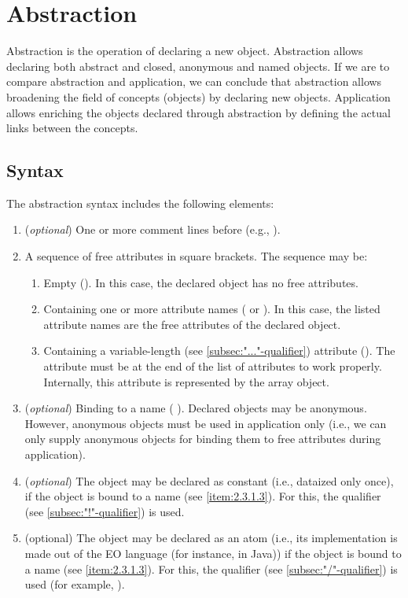 \documentclass[12pt]{book}
\begin{document}
\section{Abstraction} \label{sec:abstracion}
Abstraction is the operation of declaring a new object. Abstraction allows declaring both abstract and closed, anonymous and named objects.
If we are to compare abstraction and application, we can conclude that abstraction allows broadening the field of concepts (objects) by declaring new objects. Application allows enriching the objects declared through abstraction by defining the actual links between the concepts.

\subsection{Syntax}
The abstraction syntax includes the following elements:

\begin{enumerate}
    \item (\textit{optional}) One or more comment lines before (e.g., ).
    \item A sequence of free attributes in square brackets. The sequence may be:
    \begin{enumerate}
        \item Empty (\ff{[]}). In this case, the declared object has no free attributes.
        \item Containing one or more attribute names (\ff{[a]} or \ff{[a b c d e]}). In this case, the listed attribute names are the free attributes of the declared object.
        \item Containing a variable-length (see \ref{subsec:"..."-qualifier}) attribute (\ff{[animals...]}). The attribute must be at the end of the list of attributes to work properly. Internally, this attribute is represented by the array object.
    \end{enumerate}
    \item \label{item:2.3.1.3} (\textit{optional}) Binding to a name ( ). Declared objects may be anonymous. However, anonymous objects must be used in application only (i.e., we can only supply anonymous objects for binding them to free attributes during application).
    \item (\textit{optional}) The object may be declared as constant (i.e., dataized only once), if the object is bound to a name (see \ref{item:2.3.1.3}). For this, the \ff{!} qualifier (see \ref{subsec:"!"-qualifier}) is used.
    \item (optional) The object may be declared as an atom (i.e., its implementation is made out of the EO language (for instance, in Java)) if the object is bound to a name (see \ref{item:2.3.1.3}). For this, the \ff{/} qualifier (see \ref{subsec:"/"-qualifier}) is used (for example, ).
\end{enumerate}
\end{document}

